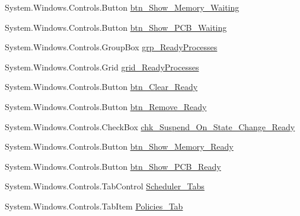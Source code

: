 \begin{DoxyCompactItemize}
\item 
System.\+Windows.\+Controls.\+Button \hyperlink{class_c_p_u___o_s___simulator_1_1_operating_system_main_window_a2d25b59e695eec3c02e389365dcffb9f}{btn\+\_\+\+Show\+\_\+\+Memory\+\_\+\+Waiting}
\item 
System.\+Windows.\+Controls.\+Button \hyperlink{class_c_p_u___o_s___simulator_1_1_operating_system_main_window_a371bab43b23ebad047bad80e0889ed61}{btn\+\_\+\+Show\+\_\+\+P\+C\+B\+\_\+\+Waiting}
\item 
System.\+Windows.\+Controls.\+Group\+Box \hyperlink{class_c_p_u___o_s___simulator_1_1_operating_system_main_window_ac76887fb899577a2695f5a16c32993c3}{grp\+\_\+\+Ready\+Processes}
\item 
System.\+Windows.\+Controls.\+Grid \hyperlink{class_c_p_u___o_s___simulator_1_1_operating_system_main_window_a4dc7b1233f61261fad09e145e63563a3}{grid\+\_\+\+Ready\+Processes}
\item 
System.\+Windows.\+Controls.\+Button \hyperlink{class_c_p_u___o_s___simulator_1_1_operating_system_main_window_a926540a5fc98f177282e425055964cb9}{btn\+\_\+\+Clear\+\_\+\+Ready}
\item 
System.\+Windows.\+Controls.\+Button \hyperlink{class_c_p_u___o_s___simulator_1_1_operating_system_main_window_a4ed06428179b1762e9ac112287e2fbc1}{btn\+\_\+\+Remove\+\_\+\+Ready}
\item 
System.\+Windows.\+Controls.\+Check\+Box \hyperlink{class_c_p_u___o_s___simulator_1_1_operating_system_main_window_ac08c18d09944dd2291917b62a7d1320e}{chk\+\_\+\+Suspend\+\_\+\+On\+\_\+\+State\+\_\+\+Change\+\_\+\+Ready}
\item 
System.\+Windows.\+Controls.\+Button \hyperlink{class_c_p_u___o_s___simulator_1_1_operating_system_main_window_a64732f37dba68b537b9e7d45d8bbf0a2}{btn\+\_\+\+Show\+\_\+\+Memory\+\_\+\+Ready}
\item 
System.\+Windows.\+Controls.\+Button \hyperlink{class_c_p_u___o_s___simulator_1_1_operating_system_main_window_a4f172867bc7041faad18ea477081ac2d}{btn\+\_\+\+Show\+\_\+\+P\+C\+B\+\_\+\+Ready}
\item 
System.\+Windows.\+Controls.\+Tab\+Control \hyperlink{class_c_p_u___o_s___simulator_1_1_operating_system_main_window_a2575de899df7277ae9c310931b8dbaa0}{Scheduler\+\_\+\+Tabs}
\item 
System.\+Windows.\+Controls.\+Tab\+Item \hyperlink{class_c_p_u___o_s___simulator_1_1_operating_system_main_window_a019542a100cb475965f111d94085a16a}{Policies\+\_\+\+Tab}
\item 

\end{DoxyCompactItemize}
